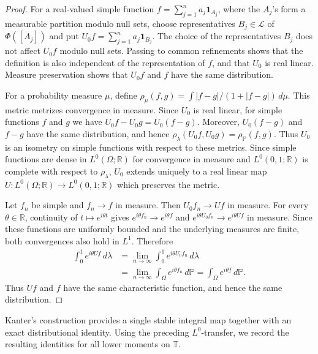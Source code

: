 \documentclass[11pt, reqno]{amsart}
\theoremstyle{definition}
\theoremstyle{remark}
\newcommand{\T}{\mathbb{T}}
\newcommand{\R}{\mathbb{R}}
\begin{document}
\begin{proof}

For a real-valued simple function
\(f=\sum_{j=1}^n a_j\mathbf1_{A_j}\), where the \(A_j\)'s form a
measurable partition modulo null sets, choose representatives
\(B_j\in\mathcal L\) of \(\Phi([A_j])\) and put
\(U_0f=\sum_{j=1}^n a_j\mathbf1_{B_j}\).
The choice of the representatives \(B_j\) does not affect \(U_0f\)
modulo null sets. Passing to common refinements shows that the
definition is also independent of the representation of \(f\), and
that \(U_0\) is real linear. Measure preservation shows that \(U_0f\)
and \(f\) have the same distribution.

For a probability measure \(\mu\), define
\(\rho_\mu(f,g)=\int |f-g|/(1+|f-g|)\,d\mu\).
This metric metrizes convergence in measure. Since \(U_0\) is real
linear, for simple functions \(f\) and \(g\) we have
\(U_0f-U_0g=U_0(f-g)\). Moreover, \(U_0(f-g)\) and \(f-g\) have the
same distribution, and hence
\(\rho_\lambda(U_0f,U_0g)=\rho_{\mathbb P}(f,g)\).
Thus \(U_0\) is an isometry on simple functions with respect to these
metrics. Since simple functions are dense in \(L^0(\Omega;\R)\) for
convergence in measure and \(L^0(0,1;\R)\) is complete with respect
to \(\rho_\lambda\), \(U_0\) extends uniquely to a real linear map
\(U:L^0(\Omega;\R)\to L^0(0,1;\R)\) which preserves the metric.

Let \(f_n\) be simple and \(f_n\to f\) in measure. Then
\(U_0f_n\to Uf\) in measure. For every \(\theta\in\R\), continuity of
\(t\mapsto e^{i\theta t}\) gives
\(e^{i\theta f_n}\to e^{i\theta f}\) and
\(e^{i\theta U_0f_n}\to e^{i\theta Uf}\) in measure.
Since these functions are uniformly bounded and the underlying
measures are finite, both convergences also hold in \(L^1\).
Therefore
\[
\begin{aligned}
        \int_0^1 e^{i\theta Uf}\,d\lambda
        &=
        \lim_{n\to\infty}
        \int_0^1 e^{i\theta U_0f_n}\,d\lambda \\
        &=
        \lim_{n\to\infty}
        \int_\Omega e^{i\theta f_n}\,d\mathbb P
        =
        \int_\Omega e^{i\theta f}\,d\mathbb P.
\end{aligned}
\]
Thus \(Uf\) and \(f\) have the same characteristic function, and
hence the same distribution.
\end{proof}

Kanter's construction provides a single stable integral map together
with an exact distributional identity. Using the preceding
\(L^0\)-transfer, we record the resulting identities for all lower
moments on \(\T\).
\end{document}
